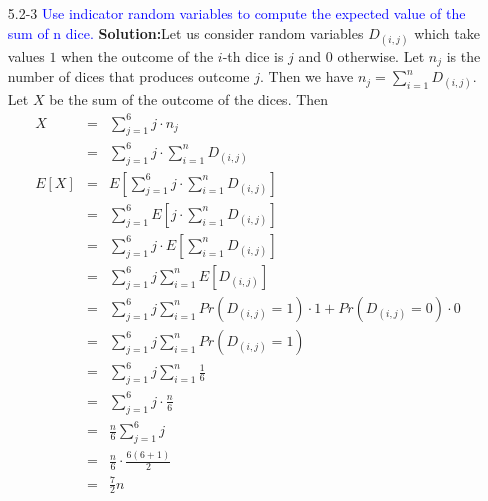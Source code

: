 \documentclass{article}
\begin{document}
\begin{enumerate}
\item[5.2-3] \textcolor{blue}{Use indicator random variables to compute the expected value of the sum of n dice.}
\textbf{Solution:}Let us consider random variables $D_{(i,j)}$ which take values $1$ when the outcome of the $i$-th dice is $j$ and $0$ otherwise. Let $n_j$ is the number of dices that produces outcome $j$. Then we have $n_j =\sum_{i=1}^{n}D_{(i,j)}$. Let $X$ be the sum of the outcome of the dices. Then
\begin{eqnarray*}
X &=& \sum_{j=1}^{6} j \cdot n_j\\
&=& \sum_{j=1}^{6} j \cdot \sum_{i=1}^{n}D_{(i,j)}\\
E[X] &=& E\left[\sum_{j=1}^{6} j \cdot\sum_{i=1}^{n}D_{(i,j)}\right]\\
&=& \sum_{j=1}^{6} E\left[j \cdot \sum_{i=1}^{n}D_{(i,j)}\right]\\
&=& \sum_{j=1}^{6} j \cdot E\left[\sum_{i=1}^{n}D_{(i,j)}\right]\\
&=& \sum_{j=1}^{6} j \sum_{i=1}^{n}E\left[D_{(i,j)}\right]\\
&=& \sum_{j=1}^{6} j \sum_{i=1}^{n}Pr(D_{(i,j)}=1) \cdot 1 + Pr(D_{(i,j)}=0) \cdot 0\\
&=& \sum_{j=1}^{6} j \sum_{i=1}^{n}Pr(D_{(i,j)}=1)\\
&=& \sum_{j=1}^{6} j \sum_{i=1}^{n}\frac{1}{6}\\
&=& \sum_{j=1}^{6} j \cdot \frac{n}{6} \\
&=& \frac{n}{6} \sum_{j=1}^{6} j \\
&=& \frac{n}{6} \cdot \frac{6(6+1)}{2}\\
&=& \frac{7}{2}n \\
\end{eqnarray*}



\end{enumerate}
\end{document}
